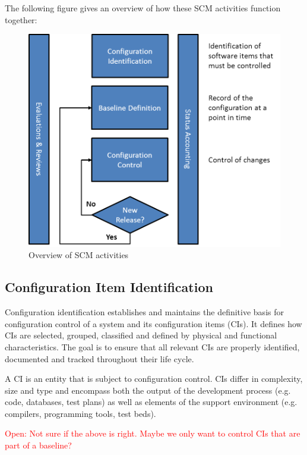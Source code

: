 \documentclass{template/openetcs_article}
\begin{document}
The following figure gives an overview of how these SCM activities function together:

\begin{figure}[H]
\centering
\caption{Overview of SCM activities}
\includegraphics[scale=0.8]{./Figure/SCM_Overview.png}
\end{figure}


\subsection{Configuration Item Identification} %
\label{sec:Configuration Item Identification}

Configuration identification establishes and maintains the definitive basis for configuration control of a system and its configuration items (CIs). It defines how CIs are selected, grouped, classified and defined by physical and functional characteristics. The goal is to ensure that all relevant CIs are properly identified, documented and tracked throughout their life cycle.

A CI is an entity that is subject to configuration control. CIs differ in complexity, size and type and encompass both the output of the development process (e.g. code, databases, test plans) as well as elements of the support environment (e.g. compilers, programming tools, test beds).

\textcolor{red}{Open: Not sure if the above is right. Maybe we only want to control CIs that are part of a baseline?}
\end{document}
